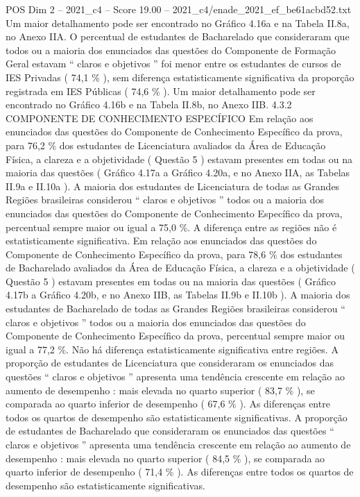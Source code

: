 \begin{textsample}{POS Dim 2 – 2021\_c4 – Score 19.00 – 2021\_c4/enade\_2021\_ef\_be61acbd52.txt}
Um maior detalhamento pode ser encontrado no Gráfico 4.16a e na Tabela II.8a, no Anexo IIA.
O percentual de estudantes de Bacharelado que consideraram que todos ou a maioria dos enunciados das questões do Componente de Formação Geral estavam “ claros e objetivos ” foi menor entre os estudantes de cursos de IES Privadas ( 74,1 \% ), sem diferença estatisticamente significativa da proporção registrada em IES Públicas ( 74,6 \% ).
Um maior detalhamento pode ser encontrado no Gráfico 4.16b e na Tabela II.8b, no Anexo IIB. 4.3.2 COMPONENTE DE CONHECIMENTO ESPECÍFICO Em relação aos enunciados das questões do Componente de Conhecimento Específico da prova, para 76,2 \% dos estudantes de Licenciatura avaliados da Área de Educação Física, a clareza e a objetividade ( Questão 5 ) estavam presentes em todas ou na maioria das questões ( Gráfico 4.17a a Gráfico 4.20a, e no Anexo IIA, as Tabelas II.9a e II.10a ).
A maioria dos estudantes de Licenciatura de todas as Grandes Regiões brasileiras considerou “ claros e objetivos ” todos ou a maioria dos enunciados das questões do Componente de Conhecimento Específico da prova, percentual sempre maior ou igual a 75,0 \%.
A diferença entre as regiões não é estatisticamente significativa.
Em relação aos enunciados das questões do Componente de Conhecimento Específico da prova, para 78,6 \% dos estudantes de Bacharelado avaliados da Área de Educação Física, a clareza e a objetividade ( Questão 5 ) estavam presentes em todas ou na maioria das questões ( Gráfico 4.17b a Gráfico 4.20b, e no Anexo IIB, as Tabelas II.9b e II.10b ).
A maioria dos estudantes de Bacharelado de todas as Grandes Regiões brasileiras considerou “ claros e objetivos ” todos ou a maioria dos enunciados das questões do Componente de Conhecimento Específico da prova, percentual sempre maior ou igual a 77,2 \%.
Não há diferença estatisticamente significativa entre regiões.
A proporção de estudantes de Licenciatura que consideraram os enunciados das questões “ claros e objetivos ” apresenta uma tendência crescente em relação ao aumento de desempenho : mais elevada no quarto superior ( 83,7 \% ), se comparada ao quarto inferior de desempenho ( 67,6 \% ).
As diferenças entre todos os quartos de desempenho são estatisticamente significativas.
A proporção de estudantes de Bacharelado que consideraram os enunciados das questões “ claros e objetivos ” apresenta uma tendência crescente em relação ao aumento de desempenho : mais elevada no quarto superior ( 84,5 \% ), se comparada ao quarto inferior de desempenho ( 71,4 \% ).
As diferenças entre todos os quartos de desempenho são estatisticamente significativas.

\end{textsample}
